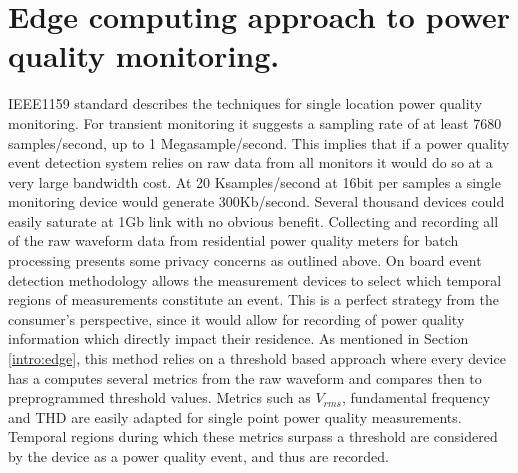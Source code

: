 \section{Edge computing approach to power quality monitoring.}\label{sec:edge-computing-approach-to-power-quality-monitoring.}

IEEE1159 standard describes the techniques for single location power quality monitoring.
For transient monitoring it suggests a sampling rate of at least 7680 samples/second, up to 1 Megasample/second.
This implies that if a power quality event detection system relies on raw data from all monitors it would do so at a very large bandwidth cost.
At 20 Ksamples/second at 16bit per samples a single monitoring device would generate 300Kb/second.
Several thousand devices could easily saturate at 1Gb link with no obvious benefit.
Collecting and recording all of the raw waveform data from residential power quality meters for batch processing presents some privacy concerns as outlined above.
On board event detection methodology allows the measurement devices to select which temporal regions of measurements constitute an event.
This is a perfect strategy from the consumer's perspective, since it would allow for recording of power quality information which directly impact their residence.
As mentioned in Section \ref{intro:edge}, this method relies on a threshold based approach where every device has a computes several metrics from the raw waveform and compares then to preprogrammed threshold values.
Metrics such as $V_{rms}$, fundamental frequency and THD are easily adapted for single point power quality measurements.
Temporal regions during which these metrics surpass a threshold are considered by the device as a power quality event, and thus are recorded.


